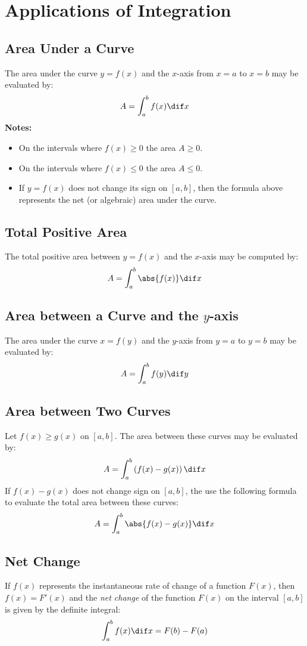 \section{Applications of Integration}
\subsection{Area Under a Curve}
	The area under the curve $y=f(x)$ and the $x$-axis from $x=a$ to $x=b$ may be evaluated by:
	\[A = \int_a^b f(x) \dif x\]
	\textbf{Notes:}
	\begin{itemize}
		\item On the intervals where $f(x) \geq 0$ the area $A \geq 0$.
		\item On the intervals where $f(x) \leq 0$ the area $A \leq 0$.
		\item If $y=f(x)$ does not change its sign on $[a,b]$, then the formula above represents the net (or algebraic) area under the curve.
	\end{itemize}
\subsection{Total Positive Area}
	The total positive area between $y=f(x)$ and the $x$-axis may be computed by:
	\[A = \int_a^b \abs{f(x)} \dif x\]
\subsection{Area between a Curve and the $y$-axis}
	The area under the curve $x=f(y)$ and the $y$-axis from $y=a$ to $y=b$ may be evaluated by:
	\[A = \int_a^b f(y) \dif y\]
\subsection{Area between Two Curves}
	Let $f(x) \geq g(x)$ on $[a,b]$. The area between these curves may be evaluated by:
	\[A = \int_a^b \left( f(x) - g(x) \right) \dif x\]
	If $f(x) - g(x)$ does not change sign on $[a,b]$, the use the following formula to evaluate the total area between these curves:
	\[A = \int_a^b \abs{f(x) - g(x)} \dif x\]
\subsection{Net Change}
	If $f(x)$ represents the instantaneous rate of change of a function $F(x)$, then $f(x) = F'(x)$ and the \emph{net change} of the function $F(x)$ on the interval $[a,b]$ is given by the definite integral:
	\[\int_a^b f(x) \dif x = F(b) - F(a)\]
